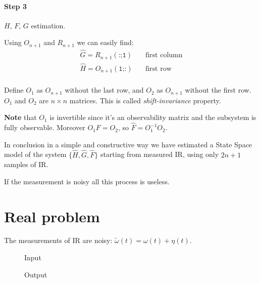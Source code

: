 \paragraph{Step 3} $H$, $F$, $G$ estimation.

Using $O_{n+1}$ and $R_{n+1}$ we can easily find:
\begin{align*}
    \hat{G} = R_{n+1}(\texttt{:;1}) & \quad\text{first column} \\
    \hat{H} = O_{n+1}(\texttt{1;:}) & \quad\text{first row} \\
\end{align*}

Define $O_1$ as $O_{n+1}$ without the last row, and $O_2$ as $O_{n+1}$ without the first row.
$O_1$ and $O_2$ are $n\times n$ matrices.
This is called \emph{shift-invariance} property.

\textbf{Note} that $O_1$ is invertible since it's an observability matrix and the subsystem is fully observable.
Moreover $O_1F = O_2$, so $\hat{F} = O_1^{-1}O_2$.

In conclusion in a simple and constructive way we have estimated a State Space model of the system $\{\hat{H}, \hat{G}, \hat{F}\}$ starting from measured IR, using only $2n+1$ samples of IR.

\begin{remark}
    If the measurement is noisy all this process is useless.
\end{remark}

\section{Real problem}

The measurements of IR are noisy: $\tilde{\omega}(t) = \omega(t) + \eta(t)$.

\begin{figure}[H]
    \begin{minipage}[t]{0.5\textwidth}
        \centering
        \caption*{Input}
    \end{minipage}
    \begin{minipage}[t]{0.5\textwidth}
        \centering
        \caption*{Output}
    \end{minipage}
\end{figure}

